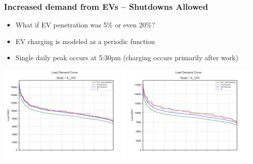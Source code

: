 \documentclass[xcolor=dvipsnames]{beamer}
\begin{document}
\begin{frame}  \frametitle{Increased demand from EVs -- Shutdowns Allowed}
\begin{itemize}
  \item What if EV penetration was 5\% or even 20\%?
  \item EV charging is modeled as a periodic function
  \item Single daily peak occurs at 5:30pm (charging occurs primarily after work)
\end{itemize}

\includegraphics[width=0.49\textwidth]{includes/LDC_5pct_EVs_IL_CHI.png}    
\includegraphics[width=0.49\textwidth]{includes/LDC_20pct_EVs_IL_CHI.png}    
      
\end{frame}
\end{document}
